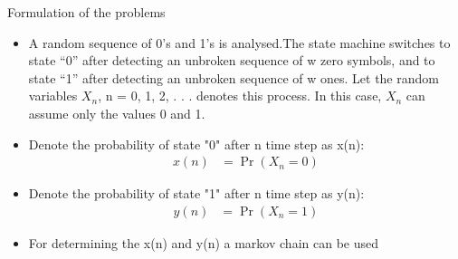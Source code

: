 \documentclass{beamer}
\begin{document}
\begin{frame}
\begin{block}{Formulation of the problems}
\begin{itemize}
 \item A random sequence of 0's and 1's is analysed.The state machine switches to state “0” after detecting an unbroken sequence of w zero symbols, and to state “1” after detecting an unbroken sequence of w ones. Let the random variables  \(X_n\), n = 0, 1, 2, . . .  denotes this process. In this case, \(X_n\) can assume only the values 0 and 1.\\
 \item Denote the probability of state "0" after n time step as x(n):
 \begin{align}
    x(n) &=\Pr(X_n=0) \nonumber
 \end{align}
 \item Denote the probability of state "1" after n time step as y(n):
 \begin{align}
    y(n)&=\Pr(X_n=1) \nonumber
 \end{align}
 \item For determining the x(n) and y(n) a markov chain can be used 
 \begin{center}
 \end{center}
\end{itemize}
\end{block}
\end{frame}
\end{document}
